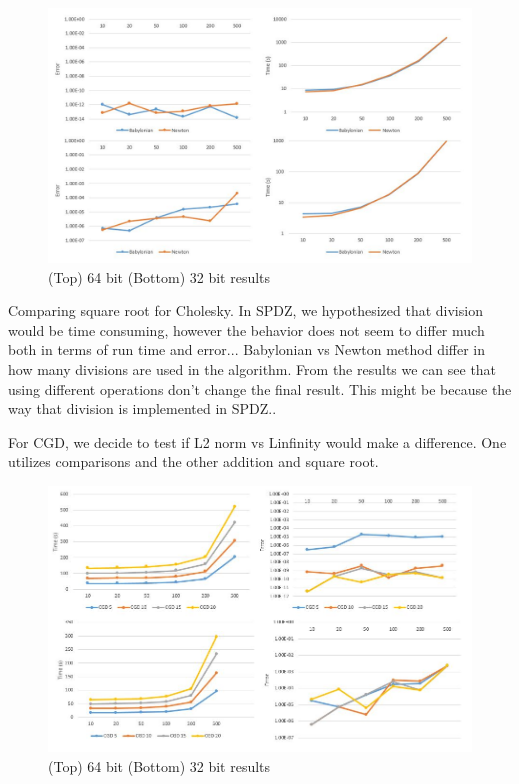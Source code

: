 \documentclass{article}
\theoremstyle{plain}
\theoremstyle{definition}
\theoremstyle{remark}
\begin{document}
\begin{figure}[h]
  \includegraphics[width=\linewidth]{sqrt.jpg}
  \caption{ (Top) 64 bit (Bottom) 32 bit results }
  \label{fig:result1}
\end{figure}

Comparing square root for Cholesky. In SPDZ, we hypothesized that division would be time consuming, however the behavior does not seem to differ much both in terms of run time and error... Babylonian vs Newton method differ in how many divisions are used in the algorithm. From the results we can see that using different operations don't change the final result. This might be because the way that division is implemented in SPDZ.. 


For CGD, we decide to test if L2 norm vs Linfinity would make a difference. One utilizes comparisons and the other addition and square root. 
\begin{figure}[h]
  \includegraphics[width=\linewidth]{l2.jpg}
  \caption{ (Top) 64 bit (Bottom) 32 bit results }
  \label{fig:result1}
\end{figure}
\end{document}
